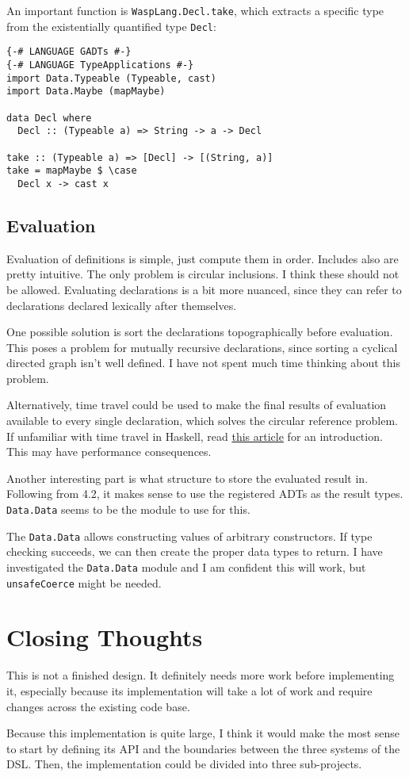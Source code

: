 An important function is \texttt{WaspLang.Decl.take}, which extracts a specific
type from the existentially quantified type \texttt{Decl}:

\begin{minipage}{\linewidth}
\begin{lstlisting}
{-# LANGUAGE GADTs #-}
{-# LANGUAGE TypeApplications #-}
import Data.Typeable (Typeable, cast)
import Data.Maybe (mapMaybe)

data Decl where
  Decl :: (Typeable a) => String -> a -> Decl

take :: (Typeable a) => [Decl] -> [(String, a)]
take = mapMaybe $ \case
  Decl x -> cast x
\end{lstlisting}
\end{minipage}

\subsection{Evaluation}

Evaluation of definitions is simple, just compute them in order. Includes also
are pretty intuitive. The only problem is circular inclusions. I think these
should not be allowed. Evaluating declarations is a bit more nuanced,
since they can refer to declarations declared lexically after themselves.

One possible solution is sort the declarations topographically before
evaluation. This poses a problem for mutually recursive declarations, since
sorting a cyclical directed graph isn't well defined. I have not spent much
time thinking about this problem.

Alternatively, time travel could be used to make the final results of
evaluation available to every single declaration, which solves
the circular reference problem. If unfamiliar with time travel in Haskell, read
\href{https://blog.csongor.co.uk/time-travel-in-haskell-for-dummies/}{this article}
for an introduction. This may have performance consequences.

Another interesting part is what structure to store the evaluated result in.
Following from 4.2, it makes sense to use the registered ADTs as the result
types. \texttt{Data.Data} seems to be the module to use for this.

The \texttt{Data.Data} allows constructing values of arbitrary constructors.
If type checking succeeds, we can then create the proper data types to return.
I have investigated the \texttt{Data.Data} module and I am confident this will
work, but \texttt{unsafeCoerce} might be needed.

\section{Closing Thoughts}

This is not a finished design. It definitely needs more work before
implementing it, especially because its implementation will take a lot of work
and require changes across the existing code base.

Because this implementation is quite large, I think it would make the most
sense to start by defining its API and the boundaries between the three systems
of the DSL. Then, the implementation could be divided into three
sub-projects.
